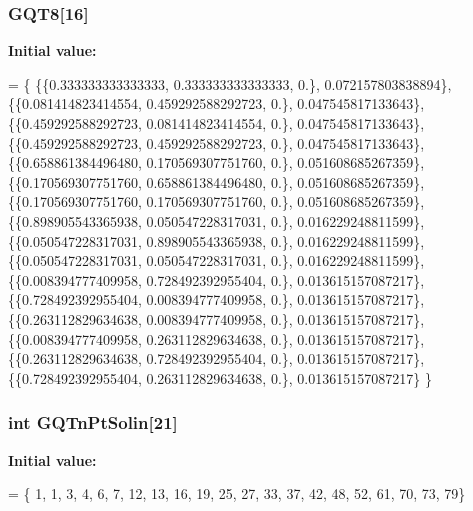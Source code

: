 \subsubsection[{G\-Q\-T8}]{ G\-Q\-T8[16]}\label{GaussQuadratureTri_8cc_a7491cc4146946298545f76d9a2954056}
{\bfseries Initial value\-:}
\begin{DoxyCode}
= \{
  \{\{0.333333333333333, 0.333333333333333, 0.\}, 0.072157803838894\},
  \{\{0.081414823414554, 0.459292588292723, 0.\}, 0.047545817133643\},
  \{\{0.459292588292723, 0.081414823414554, 0.\}, 0.047545817133643\},
  \{\{0.459292588292723, 0.459292588292723, 0.\}, 0.047545817133643\},
  \{\{0.658861384496480, 0.170569307751760, 0.\}, 0.051608685267359\},
  \{\{0.170569307751760, 0.658861384496480, 0.\}, 0.051608685267359\},
  \{\{0.170569307751760, 0.170569307751760, 0.\}, 0.051608685267359\},
  \{\{0.898905543365938, 0.050547228317031, 0.\}, 0.016229248811599\},
  \{\{0.050547228317031, 0.898905543365938, 0.\}, 0.016229248811599\},
  \{\{0.050547228317031, 0.050547228317031, 0.\}, 0.016229248811599\},  
  \{\{0.008394777409958, 0.728492392955404, 0.\}, 0.013615157087217\},
  \{\{0.728492392955404, 0.008394777409958, 0.\}, 0.013615157087217\},
  \{\{0.263112829634638, 0.008394777409958, 0.\}, 0.013615157087217\},
  \{\{0.008394777409958, 0.263112829634638, 0.\}, 0.013615157087217\},
  \{\{0.263112829634638, 0.728492392955404, 0.\}, 0.013615157087217\},
  \{\{0.728492392955404, 0.263112829634638, 0.\}, 0.013615157087217\}
\}
\end{DoxyCode}
\subsubsection[{G\-Q\-Tn\-Pt\-Solin}]{\setlength{\rightskip}{0pt plus 5cm}int G\-Q\-Tn\-Pt\-Solin[21]}\label{GaussQuadratureTri_8cc_af168e33382c06856747d0f62faa2facb}
{\bfseries Initial value\-:}
\begin{DoxyCode}
= \{
  1,
  1,
  3,
  4,
  6,
  7,
  12,
  13,
  16,
  19,
  25,
  27,
  33,
  37,
  42,
  48,
  52,
  61,
  70,
  73,
  79\}
\end{DoxyCode}
